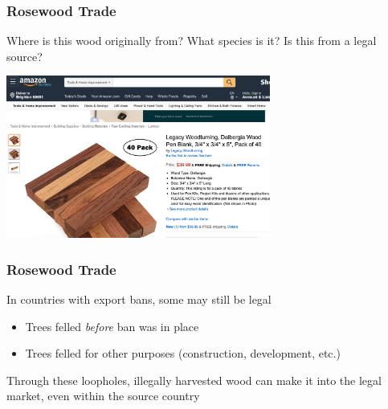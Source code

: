\documentclass[10pt]{beamer}
\begin{document}
\begin{frame}[t]
\frametitle{Rosewood Trade}
\vspace{0.25cm}

	Where is this wood originally from? What species is it? Is this from a legal source?\\
	
	\vspace{0.25cm}
	
	\begin{center}
		\includegraphics[width=0.65\textwidth]{figures/amazon.png}
	\end{center} 
\end{frame}


\begin{frame}[t]
\frametitle{Rosewood Trade}
\vspace{0.5cm}

	In countries with export bans, some may still be legal\\
		\medskip
		\begin{itemize}
			\item Trees felled \emph{before} ban was in place
			\medskip
			\item Trees felled for other purposes (construction, development, etc.)
		\end{itemize}
		\bigskip
	
	Through these loopholes, illegally harvested wood can make it into the legal market, even within the source country	
\end{frame}
\end{document}
